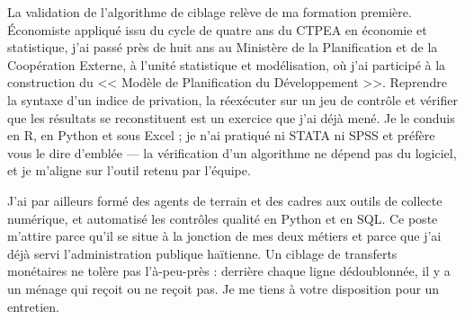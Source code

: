 \documentclass[10pt,a4paper,sans]{moderncv}
\begin{document}
La validation de l'algorithme de ciblage relève de ma formation première. Économiste appliqué issu du cycle de quatre ans du CTPEA en économie et statistique, j'ai passé près de huit ans au Ministère de la Planification et de la Coopération Externe, à l'unité statistique et modélisation, où j'ai participé à la construction du << Modèle de Planification du Développement >>. Reprendre la syntaxe d'un indice de privation, la réexécuter sur un jeu de contrôle et vérifier que les résultats se reconstituent est un exercice que j'ai déjà mené. Je le conduis en R, en Python et sous Excel ; je n'ai pratiqué ni STATA ni SPSS et préfère vous le dire d'emblée --- la vérification d'un algorithme ne dépend pas du logiciel, et je m'aligne sur l'outil retenu par l'équipe.

J'ai par ailleurs formé des agents de terrain et des cadres aux outils de collecte numérique, et automatisé les contrôles qualité en Python et en SQL. Ce poste m'attire parce qu'il se situe à la jonction de mes deux métiers et parce que j'ai déjà servi l'administration publique haïtienne. Un ciblage de transferts monétaires ne tolère pas l'à-peu-près : derrière chaque ligne dédoublonnée, il y a un ménage qui reçoit ou ne reçoit pas. Je me tiens à votre disposition pour un entretien.

\makeletterclosing
\end{document}
